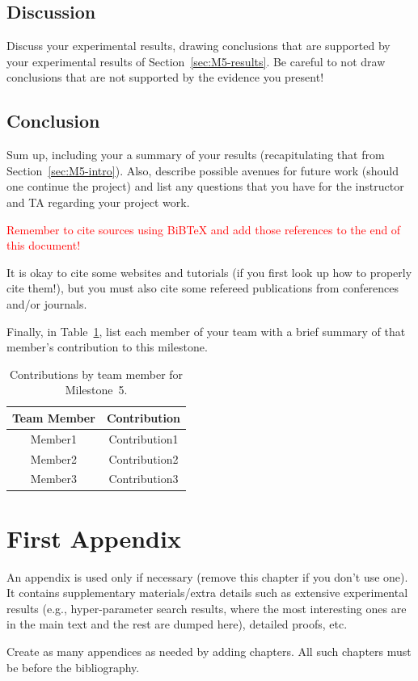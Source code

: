 \documentclass{report}
\begin{document}
\section{Discussion}

Discuss your experimental results, drawing conclusions that are supported by your experimental results of Section~\ref{sec:M5-results}.   Be careful to not draw conclusions that are not supported by the evidence you present!

\section{Conclusion}

Sum up, including your a summary of your results  (recapitulating that from Section~\ref{sec:M5-intro}).  Also, describe possible avenues for future work (should one continue the project) and list any questions that you have for the instructor and TA regarding your project work.

\textcolor{red}{Remember to cite sources using BiBTeX and add those references to the end of this document!}

It is okay to cite some websites and tutorials (if you first look up how to properly cite them!), but you must also cite some refereed publications from conferences and/or journals.

Finally, in Table~\ref{tab:contribution5}, list each member of your team with a brief summary of that member's contribution to this milestone.

\begin{table}[]
    \caption{Contributions by team member for Milestone~5.}
    \centering
    \begin{tabular}{|c|c|} \hline
    {\bf Team Member}     &  {\bf Contribution}  \\ \hline
    Member1     &  Contribution1 \\
    Member2     &  Contribution2 \\
    Member3     &  Contribution3 \\ \hline
    \end{tabular}
    \label{tab:contribution5}
\end{table}

\appendix

\chapter{First Appendix}

An appendix is used only if necessary (remove this chapter if you don't use one). It contains supplementary materials/extra details such as extensive experimental results (e.g., hyper-parameter search results, where the most interesting ones are in the main text and the rest are dumped here), detailed proofs, etc. 

Create as many appendices as needed by adding chapters. All such chapters must be before the bibliography. 
\fi



\end{document}
